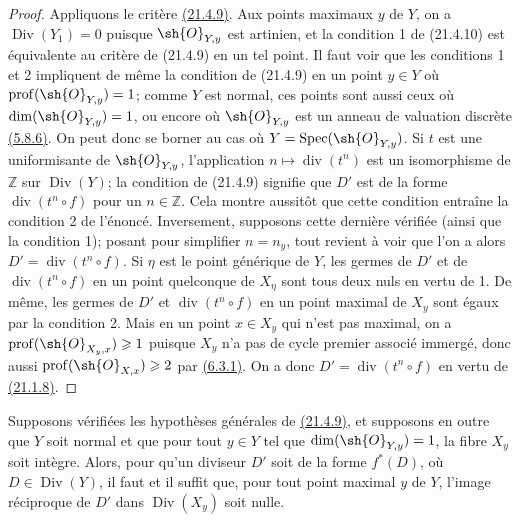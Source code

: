 \begin{proof}
Appliquons le critère {\hyperlink{ega4.c04.prop.21-4-9}{(21.4.9)}}.
Aux points maximaux $y$ de $Y$, on a $\operatorname{Div}(Y_1)=0$
puisque $\sh{O}_{Y,y}$ est artinien, et la condition 1\textdegree{} de
(21.4.10) est équivalente au critère de (21.4.9) en un tel point. Il
faut voir que les conditions 1\textdegree{} et 2\textdegree{} impliquent
de même la condition de (21.4.9) en un point $y\in Y$ où
$\operatorname{prof}(\sh{O}_{Y,y})=1$; comme $Y$ est normal, ces points
sont aussi ceux où $\dim(\sh{O}_{Y,y})=1$, ou encore où
$\sh{O}_{Y,y}$ est un anneau de valuation discrète
{\hyperlink{ega4.c04.thm.5-8-6}{(5.8.6)}}. On peut donc se borner au
cas où $Y=\operatorname{Spec}(\sh{O}_{Y,y})$. Si $t$ est une
uniformisante de $\sh{O}_{Y,y}$, l'application
$n\mapsto\operatorname{div}(t^n)$ est un isomorphisme de $\mathbb Z$
sur $\operatorname{Div}(Y)$; la condition de (21.4.9) signifie que
$D'$ est de la forme $\operatorname{div}(t^n\circ f)$ pour un
$n\in\mathbb Z$. Cela montre aussitôt que cette condition entraîne la
condition 2\textdegree{} de l'énoncé. Inversement, supposons cette
dernière vérifiée (ainsi que la condition 1\textdegree{}); posant pour
simplifier $n=n_y$, tout revient à voir que l'on a alors
$D'=\operatorname{div}(t^n\circ f)$. Si $\eta$ est le point générique
de $Y$, les germes de $D'$ et de $\operatorname{div}(t^n\circ f)$ en
un point quelconque de $X_\eta$ sont tous deux nuls en vertu de
1\textdegree{}. De même, les germes de $D'$ et
$\operatorname{div}(t^n\circ f)$ en un point maximal de $X_y$ sont
égaux par la condition 2\textdegree{}. Mais en un point $x\in X_y$ qui
n'est pas maximal, on a
$\operatorname{prof}(\sh{O}_{X_y,x})\geq1$ puisque $X_y$ n'a pas de
cycle premier associé immergé, donc aussi
$\operatorname{prof}(\sh{O}_{X,x})\geq2$ par
{\hyperlink{ega4.c04.prop.6-3-1}{(6.3.1)}}. On a donc
$D'=\operatorname{div}(t^n\circ f)$ en vertu de
{\hyperlink{ega4.c04.prop.21-1-8}{(21.1.8)}}.
\end{proof}

\begin{corollary}[21.4.11]
\label{IV.21.4.11}
Supposons vérifiées les hypothèses générales de
{\hyperlink{ega4.c04.prop.21-4-9}{(21.4.9)}}, et supposons en outre que
$Y$ soit normal et que pour tout $y\in Y$ tel que
$\dim(\sh{O}_{Y,y})=1$, la fibre $X_y$ soit intègre. Alors, pour qu'un
diviseur $D'$ soit de la forme $f^*(D)$, où
$D\in\operatorname{Div}(Y)$, il faut et il suffit que, pour tout point
maximal $y$ de $Y$, l'image réciproque de $D'$ dans
$\operatorname{Div}(X_y)$ soit nulle.
\end{corollary}

